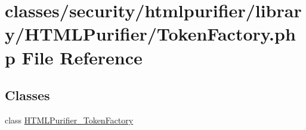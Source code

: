 \hypertarget{TokenFactory_8php}{\section{classes/security/htmlpurifier/library/\+H\+T\+M\+L\+Purifier/\+Token\+Factory.php File Reference}
\label{TokenFactory_8php}
}
\subsection*{Classes}
\begin{DoxyCompactItemize}
\item 
class \hyperlink{classHTMLPurifier__TokenFactory}{H\+T\+M\+L\+Purifier\+\_\+\+Token\+Factory}
\end{DoxyCompactItemize}
